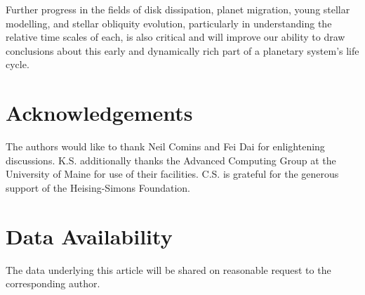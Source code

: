 \documentclass[twocolumn]{aastex63}
\begin{document}
Further progress in the fields of disk dissipation, planet migration, young stellar modelling, and stellar obliquity evolution, particularly in understanding the relative time scales of each, is also critical and will improve our ability to draw conclusions about this early and dynamically rich part of a planetary system’s life cycle.

\section{Acknowledgements}
The authors would like to thank Neil Comins and Fei Dai for enlightening discussions. K.S. additionally thanks the Advanced Computing Group at the University of Maine for use of their facilities. C.S. is grateful for the generous support of the Heising-Simons Foundation.

\section{Data Availability}
The data underlying this article will be shared on reasonable request to the corresponding author.



\end{document}
